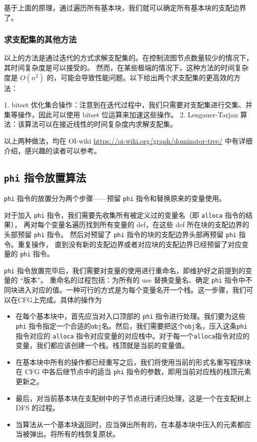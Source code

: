 基于上面的原理，通过遍历所有基本块，我们就可以确定所有基本块的支配边界了。

\subsubsection{求支配集的其他方法}

以上的方法是通过迭代的方式求解支配集的。在控制流图节点数量较少的情况下，其时间复杂度是可以接受的。
然而，在某些极端的情况下，这种方法的时间复杂度是 $O(n^2)$ 的，可能会导致性能问题。以下给出两个求支配集的更高效的方法：

1. bitset 优化集合操作：注意到在迭代过程中，我们只需要对支配集进行交集、并集等操作，因此可以使用 bitset 位运算来加速这些操作。
2. Lengauer-Tarjan 算法：该算法可以在接近线性的时间复杂度内求解支配集。

以上两种做法，均在 OI-wiki \url{https://oi-wiki.org/graph/dominator-tree/} 中有详细介绍，感兴趣的读者可以参考。

\subsection{\texttt{phi} 指令放置算法}

\texttt{phi} 指令的放置分为两个步骤——预留 \texttt{phi} 指令和替换原来的变量使用。

对于加入 \texttt{phi} 指令，我们需要先收集所有被定义过的变量名（即 \texttt{alloca} 指令的结果），
再对每个变量名遍历找到所有变量的 def，在这些 def 所在块的支配边界的头部预留 \texttt{phi} 指令。
然后对预留了 \texttt{phi} 指令的块的支配边界头部再预留 \texttt{phi} 指令。重复操作，
直到没有新的支配边界或者对应块的支配边界已经预留了对应变量的 \texttt{phi} 指令。

\texttt{phi} 指令放置完毕后，我们需要对变量的使用进行重命名，即维护好之前提到的变量的 “版本”。
重命名的过程包括：为所有的 use 替换变量名、确定 \texttt{phi} 指令中不同块进入对应的值。一种可行的方式是为每个变量名开一个栈。这一步骤，我们可以在CFG上完成。具体的操作为
\begin{itemize}
  \item 在每个基本块中，首先应当对入口顶部的 \texttt{phi} 指令进行处理。我们要为这些\texttt{phi} 指令指定一个合适的\texttt{obj}名。然后，我们需要把这个\texttt{obj}名，压入这条\texttt{phi} 指令对应的 \texttt{alloca} 指令对应变量的对应栈中。对于每一个\texttt{alloca}指令对应的变量，我们都应该创建一个栈。栈顶就是当前的变量值。
  \item 在基本块中所有的操作都已经重写之后，我们将使用当前的形式名重写程序块在 CFG 中各后继节点中的适当 \texttt{phi} 指令的参数，即用当前对应栈的栈顶元素更新之。
  \item 最后，对当前基本块在支配树中的子节点进行递归处理，这是一个在支配树上 DFS 的过程。
  \item 当算法从一个基本块返回时，应当弹出所有的，在本基本块中压入的元素都应当被弹出。将所有的栈恢复原状。
\end{itemize}

